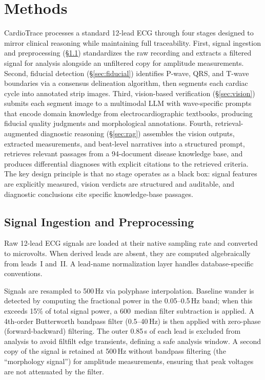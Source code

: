 \documentclass[journal,compsoc]{IEEEtran}
\newcommand{\system}{CardioTrace}
\newcommand{\ms}{\,\text{ms}}
\begin{document}
\section{Methods}
\label{sec:methods}

\system{} processes a standard 12-lead ECG through four stages designed to mirror clinical reasoning while maintaining full traceability. First, signal ingestion and preprocessing (\S\ref{sec:signal}) standardizes the raw recording and extracts a filtered signal for analysis alongside an unfiltered copy for amplitude measurements. Second, fiducial detection (\S\ref{sec:fiducial}) identifies P-wave, QRS, and T-wave boundaries via a consensus delineation algorithm, then segments each cardiac cycle into annotated strip images. Third, vision-based verification (\S\ref{sec:vision}) submits each segment image to a multimodal LLM with wave-specific prompts that encode domain knowledge from electrocardiographic textbooks, producing fiducial quality judgments and morphological annotations. Fourth, retrieval-augmented diagnostic reasoning (\S\ref{sec:rag}) assembles the vision outputs, extracted measurements, and beat-level narratives into a structured prompt, retrieves relevant passages from a 94-document disease knowledge base, and produces differential diagnoses with explicit citations to the retrieved criteria. The key design principle is that no stage operates as a black box: signal features are explicitly measured, vision verdicts are structured and auditable, and diagnostic conclusions cite specific knowledge-base passages.

\subsection{Signal Ingestion and Preprocessing}
\label{sec:signal}

Raw 12-lead ECG signals are loaded at their native sampling rate and converted to microvolts. When derived leads are absent, they are computed algebraically from leads~I and~II. A lead-name normalization layer handles database-specific conventions.

Signals are resampled to 500\,Hz via polyphase interpolation. Baseline wander is detected by computing the fractional power in the 0.05--0.5\,Hz band; when this exceeds 15\% of total signal power, a 600\ms{} median filter subtraction is applied. A 4th-order Butterworth bandpass filter (0.5--40\,Hz) is then applied with zero-phase (forward-backward) filtering. The outer 0.85\,s of each lead is excluded from analysis to avoid filtfilt edge transients, defining a safe analysis window. A second copy of the signal is retained at 500\,Hz without bandpass filtering (the ``morphology signal'') for amplitude measurements, ensuring that peak voltages are not attenuated by the filter.
\end{document}
